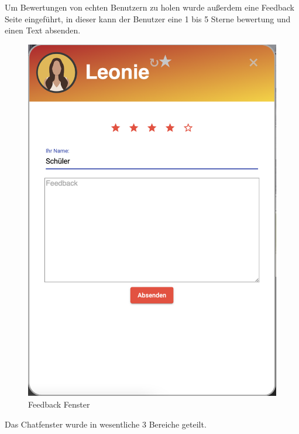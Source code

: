 Um Bewertungen von echten Benutzern zu holen wurde außerdem eine Feedback Seite eingeführt, in dieser kann der Benutzer eine 1 bis 5 Sterne bewertung und einen Text absenden.

\begin{figure}[hbt!]
    \centering
    \includegraphics[scale=0.3]{pics/feedback}
    \caption{Feedback Fenster}
    \label{fig:impl:feedback}
\end{figure}

Das Chatfenster wurde in wesentliche 3 Bereiche geteilt.

